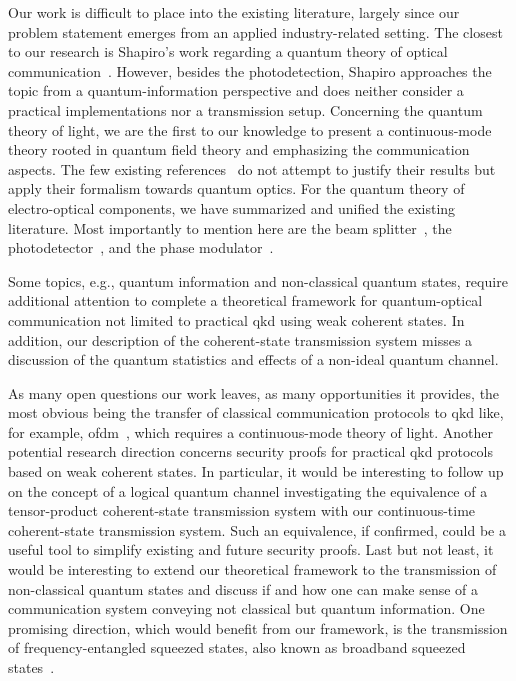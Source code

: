 Our work is difficult to place into the existing literature, largely since our problem statement emerges from an applied industry-related setting.
The closest to our research is Shapiro's work regarding a quantum theory of optical communication~\cite{Shapiro2009}.
However, besides the photodetection, Shapiro approaches the topic from a quantum-information perspective and does neither consider a practical implementations nor a transmission setup.
Concerning the quantum theory of light, we are the first to our knowledge to present a continuous-mode theory rooted in quantum field theory and emphasizing the communication aspects.
The few existing references~\cite{Barnett2002,Loudon2000} do not attempt to justify their results but apply their formalism towards quantum optics.
For the quantum theory of electro-optical components, we have summarized and unified the existing literature.
Most importantly to mention here are the beam splitter~\cite{Haroche2006,Leonhardt2003,Vogel2006}, the photodetector~\cite{Vogel2006,Mandel1995,Shapiro2009}, and the phase modulator~\cite{Horoshko2018,QuesadaMejia2015}.

Some topics, e.g., quantum information and non-classical quantum states, require additional attention to complete a theoretical framework for quantum-optical communication not limited to practical \gls{qkd} using weak coherent states.
In addition, our description of the coherent-state transmission system misses a discussion of the quantum statistics and effects of a non-ideal quantum channel.

As many open questions our work leaves, as many opportunities it provides, the most obvious being the transfer of classical communication protocols to \gls{qkd} like, for example, \gls{ofdm}~\cite{Bahrani2015}, which requires a continuous-mode theory of light.
Another potential research direction concerns security proofs for practical \gls{qkd} protocols based on weak coherent states.
In particular, it would be interesting to follow up on the concept of a logical quantum channel investigating the equivalence of a tensor-product coherent-state transmission system with our continuous-time coherent-state transmission system.
Such an equivalence, if confirmed, could be a useful tool to simplify existing and future security proofs.
Last but not least, it would be interesting to extend our theoretical framework to the transmission of non-classical quantum states and discuss if and how one can make sense of a communication system conveying not classical but quantum information.
One promising direction, which would benefit from our framework, is the transmission of frequency-entangled squeezed states, also known as broadband squeezed states~\cite{Vogel2006,Mandel1995}.